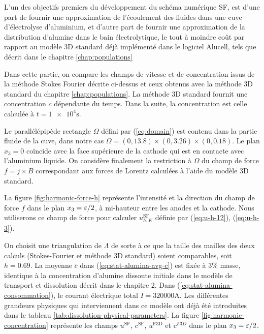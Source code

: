 L'un des objectifs premiers du développement du schéma numérique
SF, est d'une part de fournir une approximation de l'écoulement des
fluides dans une cuve d'électrolyse d'aluminium, et d'autre part
de fournir une approximation de la distribution d'alumine dans le bain
électrolytique, le tout à moindre coût par rapport au modèle
3D standard déjà implémenté dans le logiciel Alucell, tels que décrit
dans le chapitre \ref{chap:populations}

Dans cette partie, on compare les champs de vitesse et de
concentration issus de la méthode Stokes Fourier décrite ci-dessus
et ceux obtenus avec la méthode 3D standard du chapitre
\ref{chap:populations}. La méthode 3D standard fournit une
concentration $c$ dépendante du temps. Dans la suite, la concentration
est celle calculée à $t = \num{1e4}\si{\second}$.

Le parallélépipède rectangle $\Omega$ défini par (\ref{eq:domain}) est
contenu dans la partie fluide de la cuve, dans notre cas $\Omega = (0,
\num{13.8})\times(0,\num{3.26})\times(0,\num{0.18})$. Le plan $x_3 =
0$ coïncide avec la face supérieure de la cathode qui est en contacte
avec l'aluminium liquide. On considère finalement la restriction à
$\Omega$ du champ de force $f = j\times B$ correspondant aux forces de
Lorentz calculées à l'aide du modèle 3D standard.

La figure \ref{fig:harmonic-force-h} représente l'intensité et la
direction du champ de force $f$ dans le plan $x_3 = \varepsilon / 2$,
à mi-hauteur entre les anodes et la cathode. Nous utiliserons ce champ
de force pour calculer $u_{h,K}^\mathrm{SF}$ définie par
(\ref{eq:u-h-12}), (\ref{eq:u-h-3}).

On choisit une triangulation de $\Lambda$ de sorte à ce que la taille
des mailles des deux calculs (Stokes-Fourier et méthode 3D standard)
soient comparables, soit $h = \num{0.69}$. La moyenne $\bar{c}$ dans
(\ref{eq:stat-alumina-avg-c}) est fixée à 3\% masse, identique à la
concentration d'alumine dissoute initiale dans le modèle de transport
et dissolution décrit dans le chapitre 2. Dans
(\ref{eq:stat-alumina-consommation}), le courant électrique total $I =
\num{320000}\si{\ampere}$. Les différentes grandeurs physiques qui
interviennent dans ce modèle ont déjà été introduites dans le tableau
\ref{tab:dissolution-physical-parameters}. La figure
\ref{fig:harmonic-concentration} représente les champs
$u^{\mathrm{SF}}$, $c^\mathrm{SF}$, $u^\mathrm{F3D}$ et $c^{F3D}$ dans
le plan $x_3 = \varepsilon / 2$.

